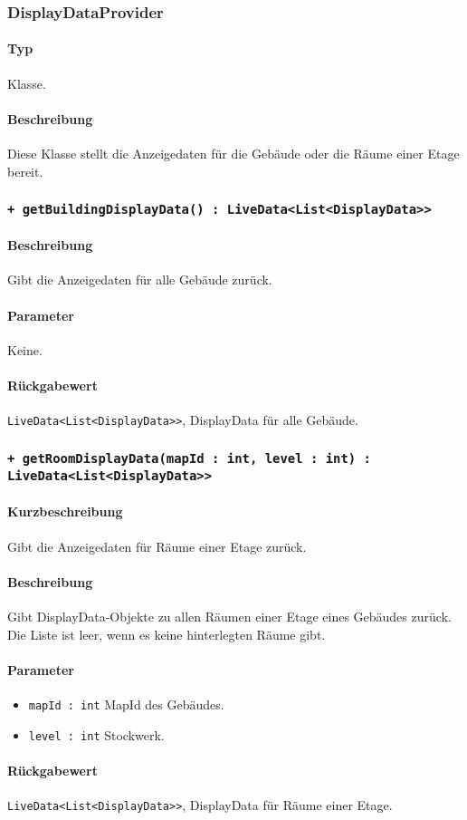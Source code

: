 \subsubsection{DisplayDataProvider}
\paragraph*{Typ}
Klasse.
\paragraph*{Beschreibung}
Diese Klasse stellt die Anzeigedaten für die Gebäude oder die Räume einer Etage bereit.

\subsubsection*{\texttt{+ getBuildingDisplayData() : LiveData<List<DisplayData>>}}%
\paragraph*{Beschreibung}
Gibt die Anzeigedaten für alle Gebäude zurück.
\paragraph*{Parameter}
Keine.
\paragraph*{Rückgabewert}
\texttt{LiveData<List<DisplayData>>}, DisplayData für alle Gebäude.

\subsubsection*{\texttt{+ getRoomDisplayData(mapId : int, level : int) : LiveData<List<DisplayData>>}}%
\paragraph*{Kurzbeschreibung}
Gibt die Anzeigedaten für Räume einer Etage zurück.
\paragraph*{Beschreibung}
Gibt DisplayData-Objekte zu allen Räumen einer Etage eines Gebäudes zurück.\\
Die Liste ist leer, wenn es keine hinterlegten Räume gibt.
\paragraph*{Parameter}
\begin{itemize}
    \item \texttt{mapId : int} MapId des Gebäudes.
    \item \texttt{level : int} Stockwerk.
\end{itemize}
\paragraph*{Rückgabewert}
\texttt{LiveData<List<DisplayData>>}, DisplayData für Räume einer Etage.